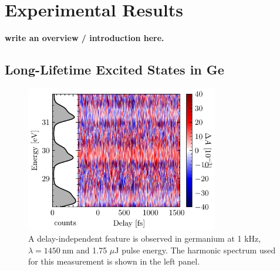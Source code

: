 

%

%


\section{Experimental Results}

\textbf{write an overview / introduction here.}


\subsection{Long-Lifetime Excited States in Ge}

\begin{figure}
	\centering
	\includegraphics[width=0.75\textwidth]{figures/chap4/ODvsDelay_1kHz_1p75uJ_dark.pdf}
	\caption{A delay-independent feature is observed in germanium at 1 kHz, $\lambda = 1450 \ \textrm{nm}$ and 1.75 $\mu$J pulse energy. The harmonic spectrum used for this measurement is shown in the left panel.}
	\label{fig:ODvsDelay_1kHz_1p75uJ_dark}
\end{figure}

